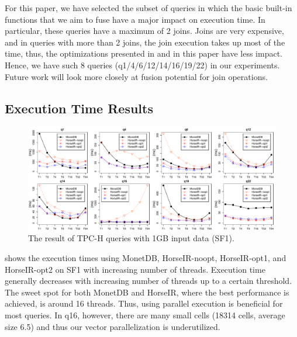For this paper, we have selected the subset of queries in which the basic built-in
functions that we aim to fuse have a major impact on execution time.
In particular, these queries have a maximum of 2 joins. Joins are very
expensive, and in queries with more than 2 joins, the join execution takes up
most of the time, thus, the optimizations presented in \OldPaper and in this
paper have less impact.
Hence, we have such 8 queries (q1/4/6/12/14/16/19/22) in our experiments.
Future work will look more closely at fusion potential for join operations.  



\subsection{Execution Time Results}

\begin{figure}[htbp]
\centering
\includegraphics[width=\textwidth]{./src/figure/sf1-v2.pdf}
\caption{The result of TPC-H queries with 1GB input data (SF1).}
\label{fig:tpch_result}
\end{figure}


 shows the execution times using MonetDB, HorseIR-noopt,
HorseIR-opt1, and HorseIR-opt2 on SF1 with increasing number of threads. 
Execution time generally decreases with increasing number of threads up to a
certain threshold. The sweet spot for both MonetDB and HorseIR, where the best
performance is achieved, is around 16 threads. Thus, using parallel execution is
beneficial for most queries. In q16, however, there are many small cells (18314 cells,
average size 6.5) and thus our vector parallelization is underutilized.

